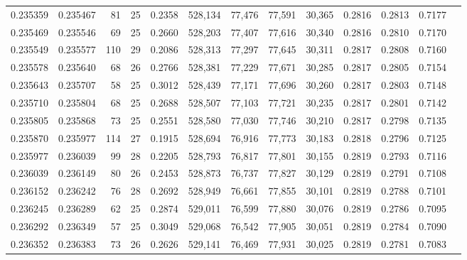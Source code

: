 \begin{tabular}{rrrrrrrrrrrrr}
0.235359 & 0.235467 &  81 &  25 &                                     0.2358 & 528,134 &  77,476 &  77,591 &  30,365 & 0.2816 & 0.2813 & 0.7177 \\
0.235469 & 0.235546 &  69 &  25 &                                     0.2660 & 528,203 &  77,407 &  77,616 &  30,340 & 0.2816 & 0.2810 & 0.7170 \\
0.235549 & 0.235577 & 110 &  29 &                                     0.2086 & 528,313 &  77,297 &  77,645 &  30,311 & 0.2817 & 0.2808 & 0.7160 \\
0.235578 & 0.235640 &  68 &  26 &                                     0.2766 & 528,381 &  77,229 &  77,671 &  30,285 & 0.2817 & 0.2805 & 0.7154 \\
0.235643 & 0.235707 &  58 &  25 &                                     0.3012 & 528,439 &  77,171 &  77,696 &  30,260 & 0.2817 & 0.2803 & 0.7148 \\
0.235710 & 0.235804 &  68 &  25 &                                     0.2688 & 528,507 &  77,103 &  77,721 &  30,235 & 0.2817 & 0.2801 & 0.7142 \\
0.235805 & 0.235868 &  73 &  25 &                                     0.2551 & 528,580 &  77,030 &  77,746 &  30,210 & 0.2817 & 0.2798 & 0.7135 \\
0.235870 & 0.235977 & 114 &  27 &                                     0.1915 & 528,694 &  76,916 &  77,773 &  30,183 & 0.2818 & 0.2796 & 0.7125 \\
0.235977 & 0.236039 &  99 &  28 &                                     0.2205 & 528,793 &  76,817 &  77,801 &  30,155 & 0.2819 & 0.2793 & 0.7116 \\
0.236039 & 0.236149 &  80 &  26 &                                     0.2453 & 528,873 &  76,737 &  77,827 &  30,129 & 0.2819 & 0.2791 & 0.7108 \\
0.236152 & 0.236242 &  76 &  28 &                                     0.2692 & 528,949 &  76,661 &  77,855 &  30,101 & 0.2819 & 0.2788 & 0.7101 \\
0.236245 & 0.236289 &  62 &  25 &                                     0.2874 & 529,011 &  76,599 &  77,880 &  30,076 & 0.2819 & 0.2786 & 0.7095 \\
0.236292 & 0.236349 &  57 &  25 &                                     0.3049 & 529,068 &  76,542 &  77,905 &  30,051 & 0.2819 & 0.2784 & 0.7090 \\
0.236352 & 0.236383 &  73 &  26 &                                     0.2626 & 529,141 &  76,469 &  77,931 &  30,025 & 0.2819 & 0.2781 & 0.7083 \\

\end{tabular}
